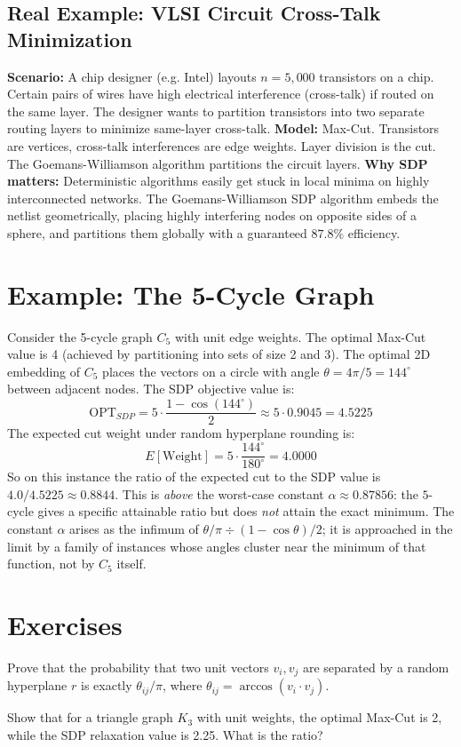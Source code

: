 \subsection*{Real Example: VLSI Circuit Cross-Talk Minimization}
\textbf{Scenario:} A chip designer (e.g. Intel) layouts $n = 5,000$ transistors on a chip. Certain pairs of wires have high electrical interference (cross-talk) if routed on the same layer. The designer wants to partition transistors into two separate routing layers to minimize same-layer cross-talk.
\textbf{Model:} Max-Cut. Transistors are vertices, cross-talk interferences are edge weights. Layer division is the cut. The Goemans-Williamson algorithm partitions the circuit layers.
\textbf{Why SDP matters:} Deterministic algorithms easily get stuck in local minima on highly interconnected networks. The Goemans-Williamson SDP algorithm embeds the netlist geometrically, placing highly interfering nodes on opposite sides of a sphere, and partitions them globally with a guaranteed $87.8\%$ efficiency.

\section{Example: The 5-Cycle Graph}
Consider the 5-cycle graph $C_5$ with unit edge weights. The optimal Max-Cut value is 4 (achieved by partitioning into sets of size 2 and 3).
The optimal 2D embedding of $C_5$ places the vectors on a circle with angle $\theta = 4\pi/5 = 144^\circ$ between adjacent nodes.
The SDP objective value is:
\[
\text{OPT}_{SDP} = 5 \cdot \frac{1 - \cos(144^\circ)}{2} \approx 5 \cdot 0.9045 = 4.5225
\]
The expected cut weight under random hyperplane rounding is:
\[
E[\text{Weight}] = 5 \cdot \frac{144^\circ}{180^\circ} = 4.0000
\]
So on this instance the ratio of the expected cut to the SDP value is $4.0 / 4.5225 \approx 0.8844$. This is \emph{above} the worst-case constant $\alpha \approx 0.87856$: the $5$-cycle gives a specific attainable ratio but does \emph{not} attain the exact minimum. The constant $\alpha$ arises as the infimum of $\theta/\pi \div (1-\cos\theta)/2$; it is approached in the limit by a family of instances whose angles cluster near the minimum of that function, not by $C_5$ itself.

\section{Exercises}
\begin{exercise}
Prove that the probability that two unit vectors $v_i, v_j$ are separated by a random hyperplane $r$ is exactly $\theta_{ij}/\pi$, where $\theta_{ij} = \arccos(v_i \cdot v_j)$.
\end{exercise}
\begin{exercise}
Show that for a triangle graph $K_3$ with unit weights, the optimal Max-Cut is 2, while the SDP relaxation value is 2.25. What is the ratio?
\end{exercise}

